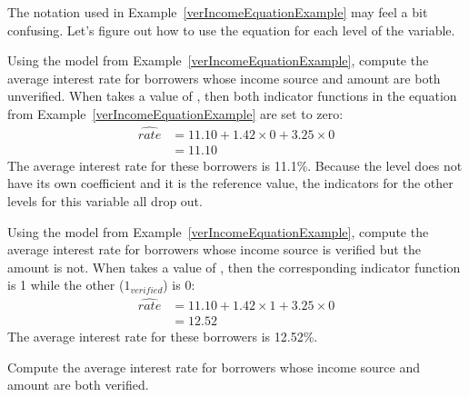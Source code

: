 
The notation used in Example~\ref{verIncomeEquationExample}
may feel a bit confusing.
Let's figure out how to use the equation for each level
of the  variable.

\begin{examplewrap}
\begin{nexample}{Using the model from
    Example~\ref{verIncomeEquationExample},
    compute the average interest rate for borrowers
    whose income source and amount are both unverified.}
  When  takes a value of ,
  then both indicator functions in the equation from
  Example~\ref{verIncomeEquationExample}
  are set to zero:
  \begin{align*}
  \widehat{rate} &= 11.10 +
      1.42 \times 0 +
      3.25 \times 0 \\
    &= 11.10
  \end{align*}
  The average interest rate for these borrowers is 11.1\%.
  Because the  level does not have its own
  coefficient and it is the reference value,
  the indicators for the other levels for this variable
  all drop out.
\end{nexample}
\end{examplewrap}

\begin{examplewrap}
\begin{nexample}{Using the model from
    Example~\ref{verIncomeEquationExample},
    compute the average interest rate for borrowers
    whose income source is verified but the amount is not.}
  When  takes a value of
  ,
  then the corresponding indicator function is 1
  while the other ($1_{verified}$) is 0:
  \begin{align*}
  \widehat{rate} &= 11.10 +
      1.42 \times 1 +
      3.25 \times 0 \\
    &= 12.52
  \end{align*}
  The average interest rate for these borrowers is 12.52\%.
\end{nexample}
\end{examplewrap}

\begin{exercisewrap}
\begin{nexercise}
Compute the average interest rate for borrowers
whose income source and amount are both verified.\footnotemark
\end{nexercise}
\end{exercisewrap}


